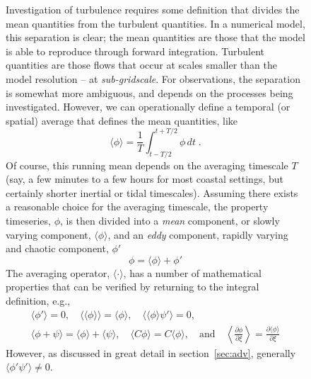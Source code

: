 \documentclass[11pt]{report}
\numberwithin{equation}{section}
\begin{document}
\begin{figure}
Investigation of turbulence requires some definition that divides the mean quantities from the turbulent quantities.  In a numerical model, this separation is clear; the mean quantities are those that the model is able to reproduce through forward integration.  Turbulent quantities are those flows that occur at scales smaller than the model resolution -- at \emph{sub-gridscale}.  For observations, the separation is somewhat more ambiguous, and depends on the processes being investigated.  However, we can operationally define a temporal (or spatial) average that defines the mean quantities, like
\begin{equation}
    \langle \phi \rangle = \frac{1}{T}\int_{t-T/2}^{t+T/2} \phi \, dt \; .
\end{equation}
Of course, this running mean depends on the averaging timescale $T$ (say, a few minutes to a few hours for most coastal settings, but certainly shorter inertial or tidal timescales).  Assuming there exists a reasonable choice for the averaging timescale, the property timeseries, $\phi$, is then divided into a \emph{mean} component, or slowly varying component, $\langle \phi \rangle$, and an \emph{eddy} component, rapidly varying and chaotic component, $\phi'$
\begin{equation}
    \phi = \langle \phi \rangle + \phi'
\end{equation}
The averaging operator, $\langle \cdot \rangle$, has a number of mathematical properties that can be verified by returning to the integral definition, e.g.,
\begin{eqnarray}
    \langle \phi' \rangle = 0, \quad 
    \langle\langle \phi \rangle\rangle = \langle \phi \rangle, \quad
    \langle \langle \phi \rangle \psi' \rangle  = 0, \quad \\
    \langle \phi  + \psi \rangle  = \langle \phi \rangle  + \langle \psi \rangle, \quad
    \langle C \phi \rangle = C \langle \phi \rangle, \quad \mathrm{and} \quad
    \left\langle \frac{\partial \phi}{\partial \xi} \right\rangle = \frac{\partial \langle \phi \rangle}{\partial \xi} 
\end{eqnarray}
However, as discussed in great detail in section~\ref{sec:adv}, generally $\langle \phi' \psi' \rangle \ne 0$.


\end{figure}
\end{document}
